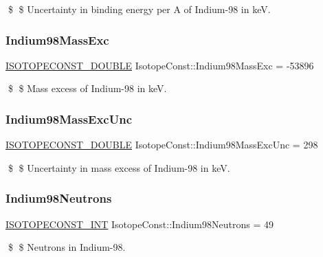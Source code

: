 \$ \$ Uncertainty in binding energy per A of Indium-\/98 in keV. \mbox{\label{group___isotope_const-_indium-_in98_ga3be2196cb35bd46898dc13d309e2ff0b}} 
\subsubsection{\texorpdfstring{Indium98\+Mass\+Exc}{Indium98MassExc}}
{\footnotesize\ttfamily \mbox{\hyperlink{group___isotope_const-_macros_ga8f45a7272ce02c0b4c65c44636ed719a}{I\+S\+O\+T\+O\+P\+E\+C\+O\+N\+S\+T\+\_\+\+D\+O\+U\+B\+LE}} Isotope\+Const\+::\+Indium98\+Mass\+Exc = -\/53896}

\$ \$ Mass excess of Indium-\/98 in keV. \mbox{\label{group___isotope_const-_indium-_in98_gaeb91b076de77ee941e6ea9b589f5bb27}} 
\subsubsection{\texorpdfstring{Indium98\+Mass\+Exc\+Unc}{Indium98MassExcUnc}}
{\footnotesize\ttfamily \mbox{\hyperlink{group___isotope_const-_macros_ga8f45a7272ce02c0b4c65c44636ed719a}{I\+S\+O\+T\+O\+P\+E\+C\+O\+N\+S\+T\+\_\+\+D\+O\+U\+B\+LE}} Isotope\+Const\+::\+Indium98\+Mass\+Exc\+Unc = 298}

\$ \$ Uncertainty in mass excess of Indium-\/98 in keV. \mbox{\label{group___isotope_const-_indium-_in98_gae16b2c2be977e60b98f09e2b39669a3e}} 
\subsubsection{\texorpdfstring{Indium98\+Neutrons}{Indium98Neutrons}}
{\footnotesize\ttfamily \mbox{\hyperlink{group___isotope_const-_macros_ga5f18360b3e99483a35c32d789e62621c}{I\+S\+O\+T\+O\+P\+E\+C\+O\+N\+S\+T\+\_\+\+I\+NT}} Isotope\+Const\+::\+Indium98\+Neutrons = 49}

\$ \$ Neutrons in Indium-\/98. \mbox{\label{group___isotope_const-_indium-_in98_gac10e33adf9702cb3f4cd6177a52ac59e}} 
